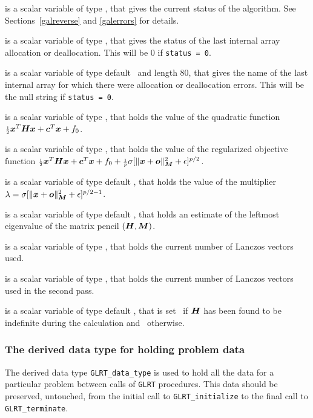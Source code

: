 \documentclass{galahad}
\newcommand{\packagename}{GL\-RT}
\begin{document}
\begin{description}
 is a scalar variable of type \integer, that gives the
current status of the algorithm. See Sections~\ref{galreverse} and
\ref{galerrors} for details.

 is a scalar variable of type \integer,
that gives the status of the last internal array allocation
or deallocation. This will be 0 if {\tt status = 0}.

 is a scalar variable of type default \character\
and length 80, that  gives the name of the last internal array
for which there were allocation or deallocation errors.
This will be the null string if {\tt status = 0}.

 is a scalar variable of type \realdp, that holds the
value of the quadratic function ${\scriptstyle \frac{1}{2}} {\bm{x}}^T {\bm{H}} {\bm{x}} + {\bm{c}}^T {\bm{x}} + f_0$.

 is a scalar variable of type \realdp, that
holds the value of the regularized objective function ${\scriptstyle \frac{1}{2}} {\bm{x}}^T {\bm{H}} {\bm{x}}
 + {\bm{c}}^T {\bm{x}} + f_0 +
  {\scriptstyle \frac{1}{p}} \sigma [ \| {\bm{x}} + {\bm{o}} \|_{{\bm{M}}}^2 + \epsilon ]^{p/2}$.

 is a scalar variable of type default
\realdp, that holds the value of the multiplier $\lambda =
\sigma [ \|{\bm{x}}+{\bm{o}}\|_{{\bm{M}}}^2 + \epsilon]^{p/2-1}$.

 is a scalar variable of type default
\realdp, that holds an estimate of the leftmost eigenvalue of the
matrix pencil $({\bm{H}},{\bm{M}})$.

 is a scalar variable of type \integer, that holds the
current number of Lanczos vectors used.

 is a scalar variable of type \integer, that holds the
current number of Lanczos vectors used in the second pass.

 is a scalar variable of type default \logical, that
is set \true\ if ${\bm{H}}$ has been found to be indefinite during the calculation
and \false\ otherwise.
\end{description}


\subsubsection{The derived data type for holding problem data}\label{typedata}
The derived data type
{\tt \packagename\_data\_type}
is used to hold all the data for a particular problem between calls of
{\tt \packagename} procedures.
This data should be preserved, untouched, from the initial call to
{\tt \packagename\_initialize}
to the final call to
{\tt \packagename\_terminate}.
\end{document}

